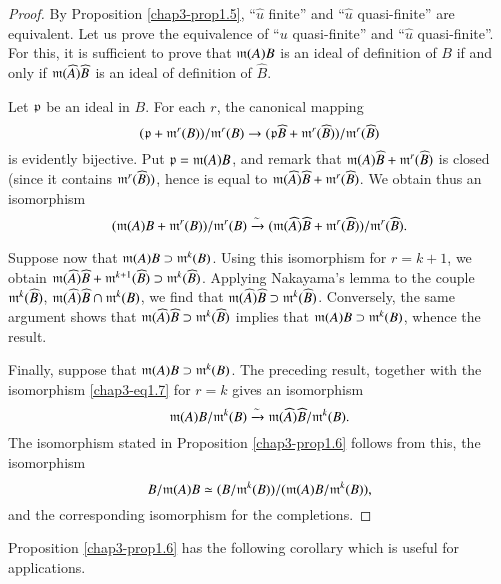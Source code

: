 \begin{proof}
By Proposition \ref{chap3-prop1.5}, ``$\widehat{u}$ finite'' and ``$\widehat{u}$ quasi-finite'' are equivalent. Let us prove the equivalence of ``$u$ quasi-finite'' and ``$\widehat{u}$ quasi-finite''. For this, it is sufficient to prove that $\mathfrak{m}(A)B$ is an ideal of definition of $B$ if and only if $\mathfrak{m}(\widehat{A})\widehat{B}$ is an ideal of definition of $\widehat{B}$.

Let $\mathfrak{p}$ be an ideal in $B$. For each $r$, the canonical mapping
$$
(\mathfrak{p}+\mathfrak{m}^{r}(B))/\mathfrak{m}^{r}(B)\to (\mathfrak{p}\widehat{B}+\mathfrak{m}^{r}(\widehat{B}))/\mathfrak{m}^{r}(\widehat{B})
$$
is evidently bijective. Put $\mathfrak{p}=\mathfrak{m}(A)B$, and remark that $\mathfrak{m}(A)\widehat{B}+\mathfrak{m}^{r}(\widehat{B})$ is closed (since it contains $\mathfrak{m}^{r}(\widehat{B}))$, hence is equal to $\mathfrak{m}(\widehat{A})\widehat{B}+\mathfrak{m}^{r}(\widehat{B})$. We obtain thus an isomorphism
\setcounter{equation}{6}
\begin{equation}
(\mathfrak{m}(A)B+\mathfrak{m}^{r}(B))/\mathfrak{m}^{r}(B)\xrightarrow{\sim}(\mathfrak{m}(\widehat{A})\widehat{B}+\mathfrak{m}^{r}(\widehat{B}))/\mathfrak{m}^{r}(\widehat{B}).\label{chap3-eq1.7}
\end{equation}

Suppose now that $\mathfrak{m}(A)B\supset \mathfrak{m}^{k}(B)$. Using this isomorphism for $r=k+1$, we obtain $\mathfrak{m}(\widehat{A})\widehat{B}+\mathfrak{m}^{k+1}(\widehat{B})\supset \mathfrak{m}^{k}(\widehat{B})$. Applying Nakayama's lemma to the couple $\mathfrak{m}^{k}(\widehat{B})$, $\mathfrak{m}(\widehat{A})\widehat{B}\cap \mathfrak{m}^{k}(B)$, we find that $\mathfrak{m}(\widehat{A})\widehat{B}\supset \mathfrak{m}^{k}(\widehat{B})$. Conversely, the same argument shows that $\mathfrak{m}(\widehat{A})\widehat{B}\supset \mathfrak{m}^{k}(\widehat{B})$ implies that $\mathfrak{m}(A)B\supset \mathfrak{m}^{k}(B)$, whence the result.

Finally, suppose that $\mathfrak{m}(A)B\supset \mathfrak{m}^{k}(B)$. The preceding result, together with the isomorphism \eqref{chap3-eq1.7} for $r=k$ gives an isomorphism
$$
\mathfrak{m}(A)B/\mathfrak{m}^{k}(B)\xrightarrow{\sim}\mathfrak{m}(\widehat{A})\widehat{B}/\mathfrak{m}^{k}(B).
$$
The isomorphism stated in Proposition \ref{chap3-prop1.6} follows from this, the isomorphism
$$
B/\mathfrak{m}(A)B\simeq (B/\mathfrak{m}^{k}(B))/(\mathfrak{m}(A)B/\mathfrak{m}^{k}(B)),
$$
and the corresponding isomorphism for the completions.
\end{proof}

Proposition \ref{chap3-prop1.6} has the following corollary which is useful for applications.


